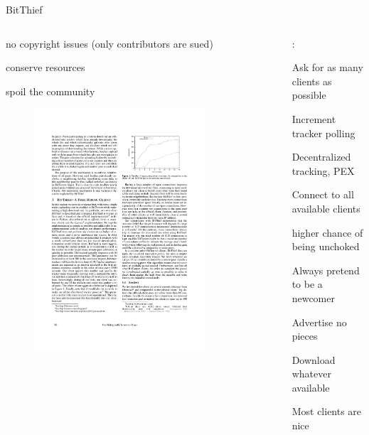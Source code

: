 \begin{frame}{BitThief}

\begin{columns}
\begin{column}{0.44\textwidth}
\BI
\item no copyright issues (only contributors are sued)
\item conserve resources
\item spoil the community
\EI

\bigskip
\begin{figure}
\includegraphics[width=0.8\textwidth]{bitthief1}
\end{figure}
\end{column}
\begin{column}{0.56\textwidth}
:
\BI
\item Ask for as many clients as possible
	\BI
	\item Increment tracker polling
	\item Decentralized tracking, PEX
	\EI
\item Connect to all available clients
	\BI
	\item higher chance of being unchoked
	\EI
\item Always pretend to be a newcomer
	\BI
	\item Advertise no pieces
	\item Download whatever available
	\item Most clients are nice
	\EI
\EI


\end{column}
\end{columns}
\end{frame}
